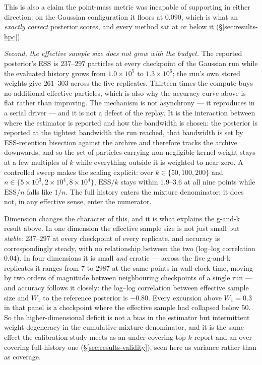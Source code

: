 This is also a claim the point-mass metric was incapable of supporting in either direction: on the Gaussian configuration it floors at $0.090$, which is what an \emph{exactly correct} posterior scores, and every method sat at or below it (\S\ref{sec:results-hpc}).

\emph{Second, the effective sample size does not grow with the budget.} The reported posterior's ESS is $237$--$297$ particles at every checkpoint of the Gaussian run while the evaluated history grows from $1.0\times10^5$ to $1.3\times10^6$; the run's own stored weights give $261$--$303$ across the five replicates. Thirteen times the compute buys no additional effective particles, which is also why the accuracy curve above is flat rather than improving. The mechanism is not asynchrony --- it reproduces in a serial driver --- and it is not a defect of the replay. It is the interaction between where the estimator is reported and how the bandwidth is chosen: the posterior is reported at the tightest bandwidth the run reached, that bandwidth is set by ESS-retention bisection against the archive and therefore tracks the archive downwards, and so the set of particles carrying non-negligible kernel weight stays at a few multiples of $k$ while everything outside it is weighted to near zero. A controlled sweep makes the scaling explicit: over $k \in \{50,100,200\}$ and $n \in \{5\times10^3, 2\times10^4, 8\times10^4\}$, $\mathrm{ESS}/k$ stays within $1.9$--$3.6$ at all nine points while $\mathrm{ESS}/n$ falls like $1/n$. The full history enters the mixture denominator; it does not, in any effective sense, enter the numerator.

Dimension changes the character of this, and it is what explains the g-and-k result above. In one dimension the effective sample size is not just small but \emph{stable}: $237$--$297$ at every checkpoint of every replicate, and accuracy is correspondingly steady, with no relationship between the two (log--log correlation $0.04$). In four dimensions it is small \emph{and} erratic --- across the five g-and-k replicates it ranges from $7$ to $2987$ at the same points in wall-clock time, moving by two orders of magnitude between neighbouring checkpoints of a single run --- and accuracy follows it closely: the log--log correlation between effective sample size and $W_1$ to the reference posterior is $-0.80$. Every excursion above $W_1 = 0.3$ in that panel is a checkpoint where the effective sample had collapsed below $50$. So the higher-dimensional deficit is not a bias in the estimator but intermittent weight degeneracy in the cumulative-mixture denominator, and it is the same effect the calibration study meets as an under-covering top-$k$ report and an over-covering full-history one (\S\ref{sec:results-validity}), seen here as variance rather than as coverage.

